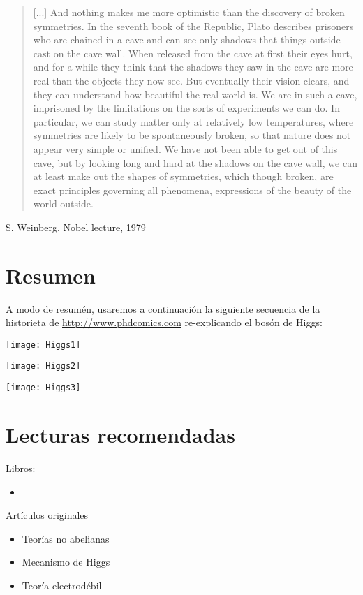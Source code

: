 \begin{quote}
[...]  And
nothing makes me more optimistic than the discovery of broken symmetries.
In the seventh book of the Republic, Plato describes prisoners who are
chained in a cave and can see only shadows that things outside cast on the
cave wall. When released from the cave at first their eyes hurt, and for a
while they think that the shadows they saw in the cave are more real than
the objects they now see. But eventually their vision clears, and they can
understand how beautiful the real world is. We are in such a cave, imprisoned
by the limitations on the sorts of experiments we can do. In particular,
we can study matter only at relatively low temperatures, where symmetries
are likely to be spontaneously broken, so that nature does not appear
very simple or unified. We have not been able to get out of this cave, but by
looking long and hard at the shadows on the cave wall, we can at least make
out the shapes of symmetries, which though broken, are exact principles
governing all phenomena, expressions of the beauty of the world outside.
\end{quote}
S. Weinberg, Nobel lecture, 1979

\section{Resumen}
A modo de resumén, usaremos a continuación la siguiente secuencia de la historieta de \url{http://www.phdcomics.com} re-explicando el bosón de Higgs:
\newpage

\texttt{[image: Higgs1]}

\texttt{[image: Higgs2]}

\texttt{[image: Higgs3]}

\newpage


\section{Lecturas recomendadas}
Libros:
\begin{itemize}
\item \cite{kane,cottingham,Pich:2005mk}
\end{itemize}

Artículos originales

\begin{itemize}
\item Teorías no abelianas \cite{Yang:1954ek}
\item Mecanismo de Higgs \cite{Higgs:1964pj}
\item Teoría electrodébil \cite{Weinberg:1967tq}
\end{itemize}

